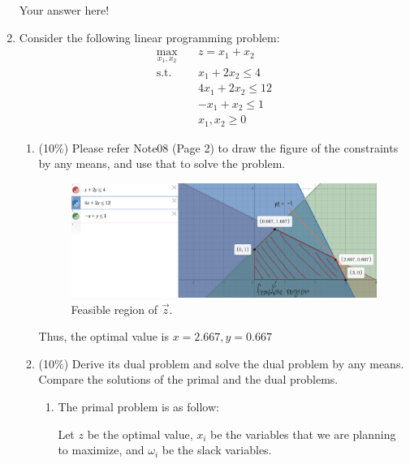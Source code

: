 \documentclass[a4paper,10pt]{article}
\begin{document}
\begin{enumerate}
{\color{blue}
    Your answer here!
}

\item Consider the following linear programming problem:
    \begin{equation}
        \begin{aligned}
            \max_{x_1,x_2} \quad & z=x_1+x_2 \\
            \textrm{s.t.} \quad & x_1 + 2x_2 \le 4  \\
                \quad& 4x_1 + 2x_2 \le 12   \\
                \quad& -x_1 + x_2 \le 1   \\
                \quad& x_1, x_2 \ge 0
        \end{aligned}
    \end{equation}

    \begin{enumerate}
        \item (10\%) Please refer Note08 (Page 2) to draw the figure of the constraints by any means, and use that to solve the problem. 
        \begin{figure}[H]
            \centering
            \includegraphics[scale=0.15]{./4a.png}
            \caption{Feasible region of $\vec{z}$.}
        \end{figure}
        {\color{blue}
            Thus, the optimal value is $x = 2.667, y = 0.667$
        }

        \item (10\%) Derive its dual problem and solve the dual problem by any means. Compare the solutions of the primal and the dual problems.
        {\color{blue} 
            \begin{enumerate}
            \item The primal problem is as follow:

                Let $z$ be the optimal value, $x_i$ be the variables that we are planning to maximize, and $\omega_i$ be the slack variables.
                

\end{enumerate}}
\end{enumerate}
\end{enumerate}
\end{document}
